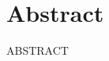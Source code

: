 \documentclass[../thesis.tex]{subfiles}
\begin{document}
    \cleardoublepage
    \begingroup
    \let\clearpage\relax
    \let\cleardoublepage\relax

    \chapter*{Abstract}
    ABSTRACT

    \endgroup

    \vfill
\end{document}
